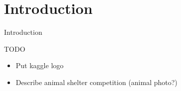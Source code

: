 \section{Introduction}

\begin{frame}[c]{Introduction}
	\begin{block}{TODO}
		\begin{itemize}
			\item Put kaggle logo
			\item Describe animal shelter competition (animal photo?)
		\end{itemize}
	\end{block}
\end{frame}
